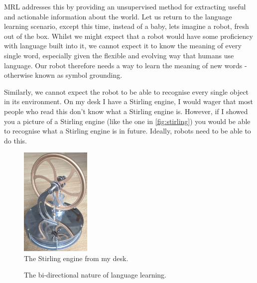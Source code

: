 \ac{MRL} addresses this by providing an unsupervised method for extracting useful and actionable information about the world. Let us return to the language learning scenario, except this time, instead of a baby, lets imagine a robot, fresh out of the box. Whilst we might expect that a robot would have some proficiency with language built into it, we cannot expect it to know the meaning of every single word, especially given the flexible and evolving way that humans use language. Our robot therefore needs a way to learn the meaning of new words - otherwise known as symbol grounding. 

Similarly, we cannot expect the robot to be able to recognise every single object in its environment. On my desk I have a Stirling engine, I would wager that most people who read this don't know what a Stirling engine is. However, if I showed you a picture of a Stirling engine (like the one in \autoref{fig:stirling}) you would be able to recognise what a Stirling engine is in future. Ideally, robots need to be able to do this.

\begin{figure}
\centering
	\includegraphics[width=0.3\textwidth]{Figs/introduction/stirling.jpg}
	\caption{The Stirling engine from my desk.}
	\label{fig:stirling}
\end{figure}

\begin{figure}
\centering
{}
\caption{The bi-directional nature of language learning.}
\label{fig:bi_ll}
\end{figure}

